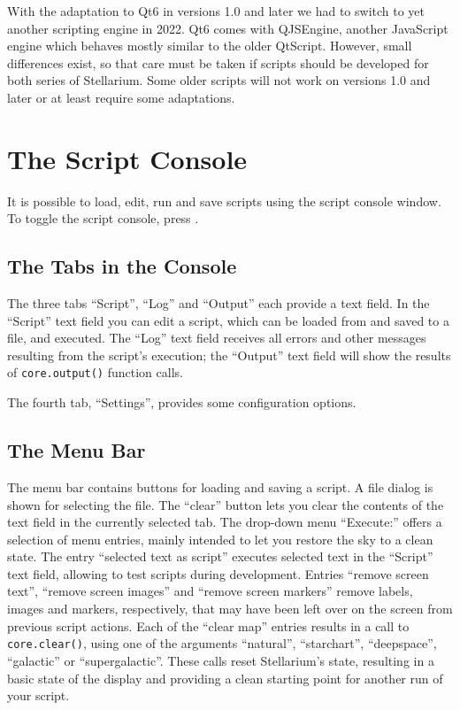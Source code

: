 With the adaptation to Qt6 in versions 1.0 and later we had to switch to 
yet another scripting engine in 2022. Qt6 comes with QJSEngine, another 
JavaScript engine which behaves mostly similar to the older QtScript. 
However, small differences exist, so that care must be taken if scripts 
should be developed for both series of Stellarium. Some older scripts 
will not work on versions 1.0 and later or at least require some adaptations. 

\section{The Script Console}
\label{sec:scripting:console}
It is possible to load, edit, run and save scripts using the script
console window. To toggle the script console, press .  

\subsection{The Tabs in the Console}

The three tabs ``Script'', ``Log'' and ``Output'' each provide a text
field. In the ``Script'' text field you can edit a script,
which can be loaded from and saved to a file, and executed. The ``Log''
text field receives all errors and other messages resulting from the
script's execution; the ``Output'' text field will show the results of
\texttt{core.output()} function calls. 

The fourth tab, ``Settings'', provides some configuration options.

\subsection{The Menu Bar}

The menu bar contains buttons for loading and saving a script. A file
dialog is shown for selecting the file. The ``clear'' button lets you
clear the contents of the text field in the currently selected tab.
The drop-down menu ``Execute:'' offers a selection of menu entries, mainly
intended to let you restore the sky to a clean state. The entry
``selected text as script'' executes selected text in the ``Script'' text
field, allowing to test scripts during development. 
Entries ``remove screen text'', ``remove screen images'' and 
``remove screen markers'' remove labels, images and markers, respectively,
that may have been left over on the screen from previous script actions. 
Each of the ``clear map'' entries
results in a call to \texttt{core.clear()}, using one of the arguments
``natural'', ``starchart'', ``deepspace'', ``galactic'' or ``supergalactic''.
These calls reset Stellarium's state, resulting in a basic state
of the display and providing a clean starting point for another run of
your script.

